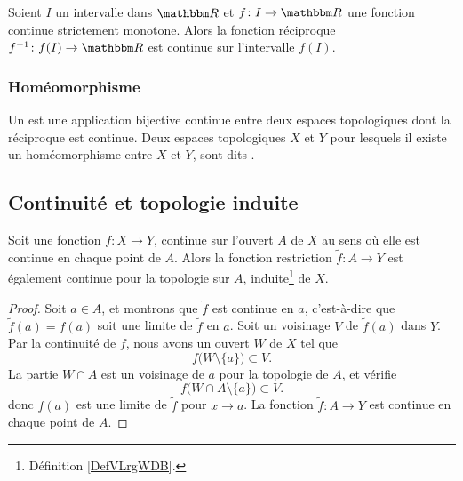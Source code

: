\begin{proposition}		\label{PropIntContMOnIvCont}
Soient $I$ un intervalle dans $\eR$ et $f\colon I\to \eR$ une fonction continue strictement monotone. Alors la fonction réciproque $f^{-1}\colon f(I)\to \eR$ est continue sur l'intervalle $f(I)$.
\end{proposition}

\subsubsection{Homéomorphisme}

\begin{definition}
    Un  est une application bijective continue entre deux espaces topologiques dont la réciproque est continue. Deux espaces topologiques $X$ et $Y$ pour lesquels il existe un homéomorphisme entre $X$ et $Y$, sont dits .
\end{definition}

\subsection{Continuité et topologie induite}
\begin{proposition}     \label{PROPooNPLBooPfmmym}
    Soit une fonction \( f\colon X\to Y\), continue sur l'ouvert \( A\) de \( X\) au sens où elle est continue en chaque point de \( A\). Alors la fonction restriction \( \tilde f\colon A\to Y\) est également continue pour la topologie sur \( A\), induite\footnote{Définition \ref{DefVLrgWDB}.} de \( X\).
\end{proposition}

\begin{proof}
    Soit \( a\in A\), et montrons que \( \tilde f\) est continue en \( a\), c'est-à-dire que \( \tilde f(a)=f(a)\) soit une limite de \( \tilde f\) en \( a\). Soit un voisinage \( V\) de \( \tilde f(a)\) dans \( Y\). Par la continuité de \( f\), nous avons un ouvert \( W\) de \( X\) tel que 
    \begin{equation}
        f\big( W\setminus\{ a \} \big)\subset V.
    \end{equation}
    La partie \( W\cap A\) est un voisinage de \( a\) pour la topologie de \( A\), et vérifie
    \begin{equation}
        f\big( W\cap A\setminus\{ a \} \big)\subset V.
    \end{equation}
    donc \( f(a)\) est une limite de \( \tilde f\) pour \( x\to a\). La fonction \( \tilde f\colon A\to Y\) est continue en chaque point de \( A\).
\end{proof}


